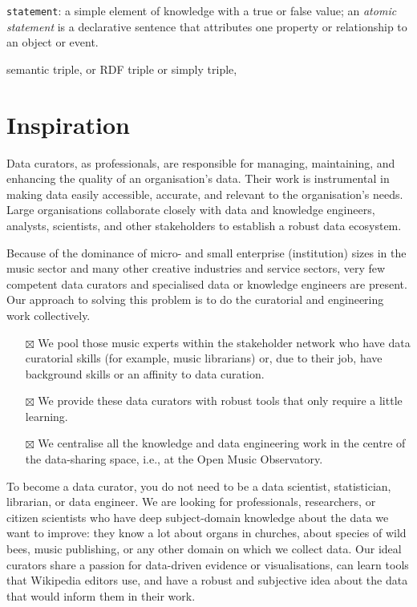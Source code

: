 \documentclass[
  letterpaper,
  DIV=11,
  numbers=noendperiod]{scrreprt}
\begin{document}
\markright{}

\texttt{statement}: a simple element of knowledge with a true or false
value; an \emph{atomic statement} is a declarative sentence that
attributes one property or relationship to an object or event.

semantic triple, or RDF triple or simply triple,


\chapter{Inspiration}\label{sec-inspiration}

Data curators, as professionals, are responsible for managing,
maintaining, and enhancing the quality of an organisation's data. Their
work is instrumental in making data easily accessible, accurate, and
relevant to the organisation's needs. Large organisations collaborate
closely with data and knowledge engineers, analysts, scientists, and
other stakeholders to establish a robust data ecosystem.

Because of the dominance of micro- and small enterprise (institution)
sizes in the music sector and many other creative industries and service
sectors, very few competent data curators and specialised data or
knowledge engineers are present. Our approach to solving this problem is
to do the curatorial and engineering work collectively.

\begin{itemize}
\item[$\boxtimes$]
  We pool those music experts within the stakeholder network who have
  data curatorial skills (for example, music librarians) or, due to
  their job, have background skills or an affinity to data curation.
\item[$\boxtimes$]
  We provide these data curators with robust tools that only require a
  little learning.
\item[$\boxtimes$]
  We centralise all the knowledge and data engineering work in the
  centre of the data-sharing space, i.e., at the Open Music Observatory.
\end{itemize}

To become a data curator, you do not need to be a data scientist,
statistician, librarian, or data engineer. We are looking for
professionals, researchers, or citizen scientists who have deep
subject-domain knowledge about the data we want to improve: they know a
lot about organs in churches, about species of wild bees, music
publishing, or any other domain on which we collect data. Our ideal
curators share a passion for data-driven evidence or visualisations, can
learn tools that Wikipedia editors use, and have a robust and subjective
idea about the data that would inform them in their work.
\end{document}
